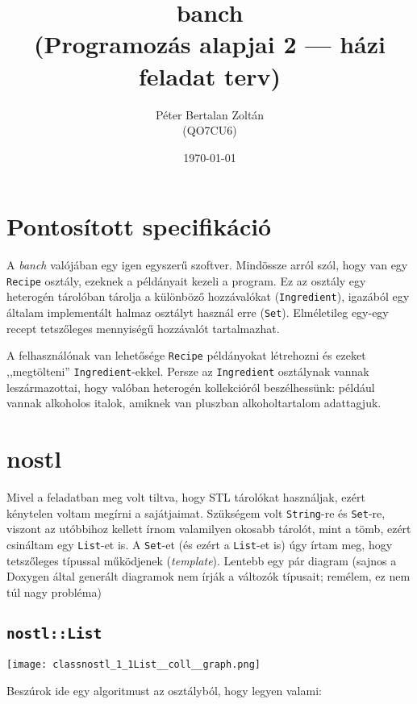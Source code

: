 \documentclass[a4paper]{article}
\title{\Huge banch \\ \small (Programozás alapjai 2 --- házi feladat terv)}
\date{\today}
\author{Péter Bertalan Zoltán \\ (QO7CU6)}
\begin{document}
\maketitle

\thispagestyle{fancy}

\section*{Pontosított specifikáció}

A \emph{banch} valójában egy igen egyszerű szoftver. Mindössze arról szól, hogy
van egy \texttt{Recipe} osztály, ezeknek a példányait kezeli a program. Ez az
osztály egy heterogén tárolóban tárolja a különböző hozzávalókat
(\texttt{Ingredient}), igazából egy általam implementált halmaz osztályt használ
erre (\texttt{Set}). Elméletileg egy-egy recept tetszőleges mennyiségű
hozzávalót tartalmazhat.

A felhasználónak van lehetősége \texttt{Recipe} példányokat létrehozni és ezeket
,,megtölteni'' \texttt{Ingredient}-ekkel. Persze az \texttt{Ingredient}
osztálynak vannak leszármazottai, hogy valóban heterogén kollekcióról
beszélhessünk: például vannak alkoholos italok, amiknek van pluszban
alkoholtartalom adattagjuk.

\section*{nostl}

Mivel a feladatban meg volt tiltva, hogy STL tárolókat használjak, ezért
kénytelen voltam megírni a sajátjaimat. Szükségem volt \texttt{String}-re és
\texttt{Set}-re, viszont az utóbbihoz kellett írnom valamilyen okosabb tárolót,
mint a tömb, ezért csináltam egy \texttt{List}-et is. A \texttt{Set}-et (és
ezért a \texttt{List}-et is) úgy írtam meg, hogy tetszőleges típussal működjenek
(\emph{template}). Lentebb egy pár diagram (sajnos a Doxygen által generált
diagramok nem írják a változók típusait; remélem, ez nem túl nagy probléma)

\subsection*{\texttt{nostl::List}}

\begin{center}
\texttt{[image: classnostl\_1\_1List\_\_coll\_\_graph.png]}
\end{center}

Beszúrok ide egy algoritmust az osztályból, hogy legyen valami:
\end{document}
